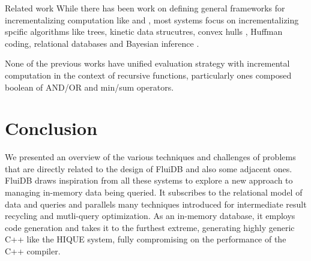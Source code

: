 \begin{corrected}{Related work}
While there has been work on defining general frameworks for
incrementalizing computation like
\cite{hammerAdaptonComposableDemanddriven2014a} and
\cite{andersonEfficientParallelSelfadjusting2021a}, most systems focus
on incrementalizing spcific algorithms like
trees\cite{acarDynamizingStaticAlgorithms2004}, kinetic data
strucutres\cite{acarKineticAlgorithmsSelfadjusting2006}, convex hulls
\cite{acarExperimentalAnalysisSelfadjusting2009}, Huffman
coding\cite{acarTraceableDataTypes2010}, relational databases
\cite{hornIncrementalRelationalLenses2018} and Bayesian inference
\cite{acarAdaptiveBayesianInference2007}.



None of the previous works have unified evaluation strategy with
incremental computation in the context of recursive functions,
particularly ones composed boolean of AND/OR and min/sum operators.
\end{corrected}

\section{Conclusion}

We presented an overview of the various techniques and challenges of
problems that are directly related to the design of FluiDB and also
some adjacent ones. FluiDB draws inspiration from all these systems to
explore a new approach to managing in-memory data being queried. It
subscribes to the relational model of data and queries and parallels
many techniques introduced for intermediate result recycling and mutli-query
optimization. As an in-memory database, it employs code
generation and takes it to the furthest extreme, generating highly
generic C++ like the HIQUE system, fully compromising on the
performance of the C++ compiler.

